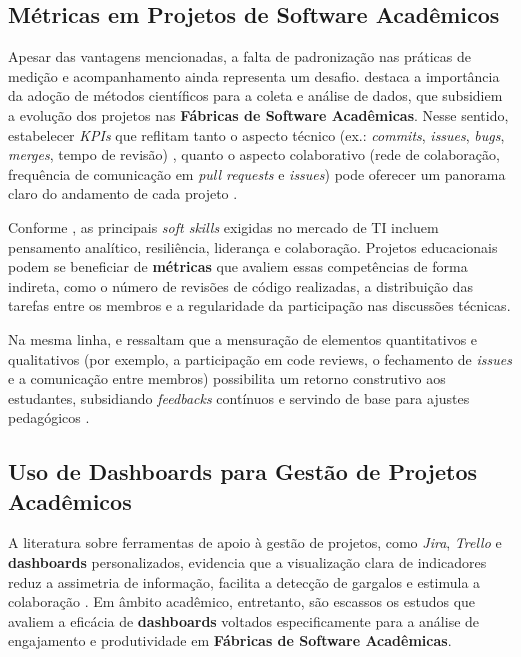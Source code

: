 \documentclass[
	12pt,           %
	openright,      %
	oneside,        %
	a4paper,        %
	brazil          %
]{abntex2}
\begin{document}
\subsection{Métricas em Projetos de Software Acadêmicos}
Apesar das vantagens mencionadas, a falta de padronização nas práticas de medição e acompanhamento ainda representa um desafio.  destaca a importância da adoção de métodos científicos para a coleta e análise de dados, que subsidiem a evolução dos projetos nas \textbf{Fábricas de Software Acadêmicas}. Nesse sentido, estabelecer \emph{KPIs} que reflitam tanto o aspecto técnico (ex.: \emph{commits}, \emph{issues}, \emph{bugs}, \emph{merges}, tempo de revisão) \cite{hamer2021using, barbosaIndicadoresConjunto2016}, quanto o aspecto colaborativo (rede de colaboração, frequência de comunicação em \emph{pull requests} e \emph{issues}) pode oferecer um panorama claro do andamento de cada projeto \cite{basili1996validation}.

Conforme , as principais \emph{soft skills} exigidas no mercado de TI incluem pensamento analítico, resiliência, liderança e colaboração. Projetos educacionais podem se beneficiar de \textbf{métricas} que avaliem essas competências de forma indireta, como o número de revisões de código realizadas, a distribuição das tarefas entre os membros e a regularidade da participação nas discussões técnicas.

Na mesma linha,  e  ressaltam que a mensuração de elementos quantitativos e qualitativos (por exemplo, a participação em code reviews, o fechamento de \emph{issues} e a comunicação entre membros) possibilita um retorno construtivo aos estudantes, subsidiando \emph{feedbacks} contínuos e servindo de base para ajustes pedagógicos \cite{almeida2006liccoes}.

\subsection{Uso de Dashboards para Gestão de Projetos Acadêmicos}
A literatura sobre ferramentas de apoio à gestão de projetos, como \emph{Jira}, \emph{Trello} e \textbf{dashboards} personalizados, evidencia que a visualização clara de indicadores reduz a assimetria de informação, facilita a detecção de gargalos e estimula a colaboração \cite{temitope2020software, dos2020usoTrello, ozkan2019agile}. Em âmbito acadêmico, entretanto, são escassos os estudos que avaliem a eficácia de \textbf{dashboards} voltados especificamente para a análise de engajamento e produtividade em \textbf{Fábricas de Software Acadêmicas}.
\end{document}
